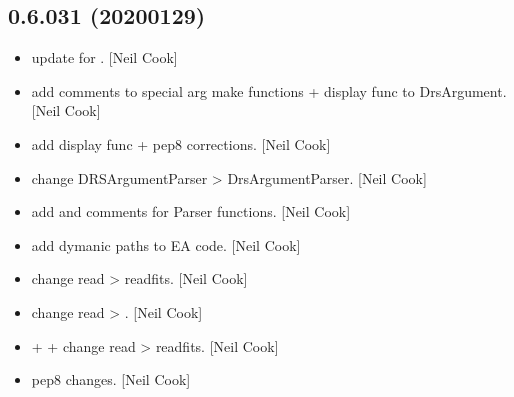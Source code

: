 \documentclass[a4paper,10pt,english]{report}
\begin{document}
\subsection{0.6.031 (2020\sphinxhyphen{}01\sphinxhyphen{}29)}
\label{\detokenize{misc/changelog:id7}}\begin{itemize}
\item {} 
 \sphinxhyphen{} update  for . {[}Neil
Cook{]}

\item {} 
 \sphinxhyphen{} add comments to special arg make functions
+ display func to DrsArgument. {[}Neil Cook{]}

\item {} 
 \sphinxhyphen{} add display func + pep8 corrections. {[}Neil
Cook{]}

\item {} 
 \sphinxhyphen{} change DRSArgumentParser \textendash{}\textgreater{}
DrsArgumentParser. {[}Neil Cook{]}

\item {} 
 \sphinxhyphen{} add  and comments for Parser
functions. {[}Neil Cook{]}

\item {} 
 \sphinxhyphen{} add dymanic paths to EA code.
{[}Neil Cook{]}

\item {} 
 \sphinxhyphen{} change read \textendash{}\textgreater{} readfits. {[}Neil
Cook{]}

\item {} 
 \sphinxhyphen{} change read \textendash{}\textgreater{} . {[}Neil Cook{]}

\item {} 
 +  +  \sphinxhyphen{} change read \textendash{}\textgreater{}
readfits. {[}Neil Cook{]}

\item {} 
 \sphinxhyphen{} pep8 changes. {[}Neil Cook{]}


\end{itemize}
\end{document}
